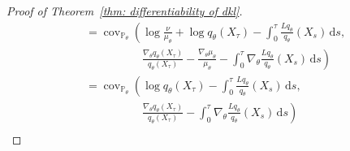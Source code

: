 \documentclass[reqno]{amsart}
\newcommand{\1}{\mathds{1}}
\renewcommand{\d}{\mathrm{d}}
\newcommand{\grad}{\nabla}
\renewcommand{\P}{\mathds{P}}
\newcommand{\Q}{\mathds{Q}}
\DeclareMathOperator{\cov}{cov}
\theoremstyle{definition}
\theoremstyle{remark}
\begin{document}
\begin{proof}[Proof of Theorem~\ref{thm: differentiability of dkl}]
\begin{align*}
                                            &= \cov_{\P_\theta} \left (     \log \frac{\nu}{\mu_\theta} + \log q_\theta (X_\tau) - \int_0^\tau \frac{L q_\theta}{q_\theta}(X_s) \, \d s , \right .\\
                                            &\qquad \qquad \quad \left .  \frac{\grad_\theta q_\theta (X_\tau)}{q_\theta(X_\tau)} - \frac{\grad_\theta \mu_\theta}{\mu_\theta} - \int_0^\tau \grad_\theta \frac{L q_\theta}{q_\theta}(X_s) \, \d s \right )\\
                                            &= \cov_{\P_\theta} \left ( \log q_\theta (X_\tau) - \int_0^\tau \frac{L q_\theta}{q_\theta}(X_s) \, \d s , \right .\\
     &\qquad \qquad \quad \left .  \frac{\grad_\theta q_\theta (X_\tau)}{q_\theta(X_\tau)} - \int_0^\tau \grad_\theta \frac{L q_\theta}{q_\theta}(X_s) \, \d s \right )\\

\end{align*}
\end{proof}
\end{document}
